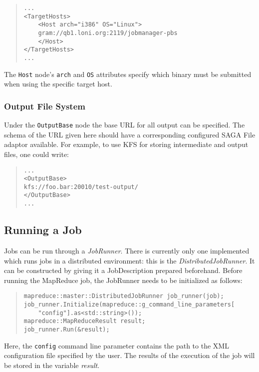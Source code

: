 \documentclass{article}
\begin{document}
\begin{quote}
\begin{verbatim}
...
<TargetHosts>
    <Host arch="i386" OS="Linux">
    gram://qb1.loni.org:2119/jobmanager-pbs
    </Host>
</TargetHosts>
...
\end{verbatim}
\end{quote}

The \texttt{Host} node's \texttt{arch} and \texttt{OS} attributes specify which binary must be submitted when using the specific target host.

\subsubsection{Output File System}

Under the \texttt{OutputBase} node the base URL for all output can be specified. The schema of the URL given here should have a corresponding configured SAGA File adaptor available. For example, to use KFS for storing intermediate and output files, one could write:

\begin{quote}
\begin{verbatim}
...
<OutputBase>
kfs://foo.bar:20010/test-output/
</OutputBase>
...
\end{verbatim}
\end{quote}

\subsection{Running a Job}

Jobs can be run through a \emph{JobRunner}. There is currently only one implemented which runs jobs in a distributed environment: this is the \emph{DistributedJobRunner}. It can be constructed by giving it a JobDescription prepared beforehand. Before running the MapReduce job, the JobRunner needs to be initialized as follows:

\begin{quote}
\begin{verbatim}
mapreduce::master::DistributedJobRunner job_runner(job);
job_runner.Initialize(mapreduce::g_command_line_parameters[
    "config"].as<std::string>());
mapreduce::MapReduceResult result;
job_runner.Run(&result);

\end{verbatim}
\end{quote}

Here, the \texttt{config} command line parameter contains the path to the XML configuration file specified by the user. The results of the execution of the job will be stored in the variable \emph{result}.
\end{document}
